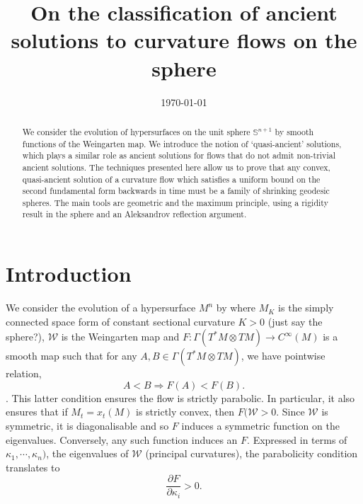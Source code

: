 \documentclass{amsart}
\begin{document}
\title[Ancient solutions to curvature flows in the sphere]
 {On the classification of ancient solutions to curvature flows on the sphere}

\curraddr{}
\email{}
\date{\today}

\dedicatory{}
\subjclass[2010]{}
\keywords{}

\begin{abstract}
We consider the evolution of hypersurfaces on the unit sphere $\mathbb{S}^{n+1}$ by smooth functions of the Weingarten map. We introduce the notion of `quasi-ancient' solutions, which plays a similar role as ancient solutions for flows that do not admit non-trivial ancient solutions. The techniques presented here allow us to prove that any convex, quasi-ancient solution of a curvature flow which satisfies a uniform bound on the second fundamental form backwards in time must be a family of shrinking geodesic spheres. The main tools are geometric and the maximum principle, using a rigidity result in the sphere and an Aleksandrov reflection argument.
\end{abstract}

\maketitle

\section{Introduction}
\label{sec:intro}

We consider the evolution of a hypersurface $M^n$ by
\eq{\label{eq:CurvFlow}
\partial_tx=-F(\mathcal{W})\nu,~ x:M^n\times[0,T)\to M_K,
}
where \(M_K\) is the simply connected space form of constant sectional curvature \(K>0\) (just say the sphere?), \(\mathcal{W}\) is the Weingarten map and \(F : \Gamma(T^\ast M \otimes TM) \to C^{\infty}(M)\) is a smooth map such that for any \(A, B \in \Gamma(T^\ast M \otimes TM)\), we have pointwise relation,
\[
A < B \Rightarrow F(A) < F(B).
\].
This latter condition ensures the flow is strictly parabolic. In particular, it also ensures that if \(M_t = x_t(M)\) is strictly convex, then \(F(\mathcal{W} > 0\). Since \(\mathcal{W}\) is symmetric, it is diagonalisable and so \(F\) induces a symmetric function on the eigenvalues. Conversely, any such function induces an \(F\). Expressed in terms of \(\kappa_1,\cdots,\kappa_n)\), the eigenvalues of \(\mathcal{W}\) (principal curvatures), the parabolicity condition translates to 
\[
\frac{\partial F}{\partial \kappa_i} > 0.
\]
\end{document}
